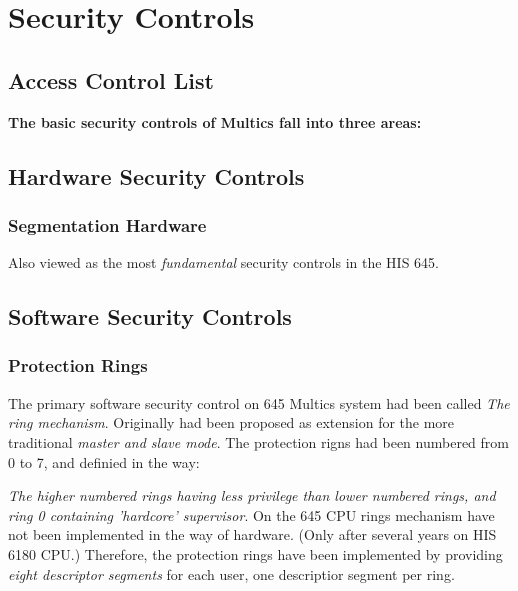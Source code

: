 \section{Security Controls}

\subsection{Access Control List}






















\textbf{The basic security controls of Multics fall into three areas:}

\subsection{Hardware Security Controls}

\subsubsection{Segmentation Hardware}

Also viewed as the most \textit{fundamental} security controls in the HIS 645.

\subsection{Software Security Controls}

\subsubsection{Protection Rings} 

The primary software security control on 645 Multics system had been called \textit{The ring mechanism}.
Originally had been proposed as extension for the more traditional \textit{master and slave mode}.
The protection rigns had been numbered from 0 to 7, and definied in the way:

\textit{The higher numbered rings having less privilege than lower numbered rings, and ring 0
containing 'hardcore' supervisor}. On the 645 CPU rings mechanism have not been implemented in the way of hardware.
(Only after several years on HIS 6180 CPU.) Therefore, the protection rings have been implemented by providing 
\textit{eight descriptor segments} for each user, one descriptior segment per ring.

